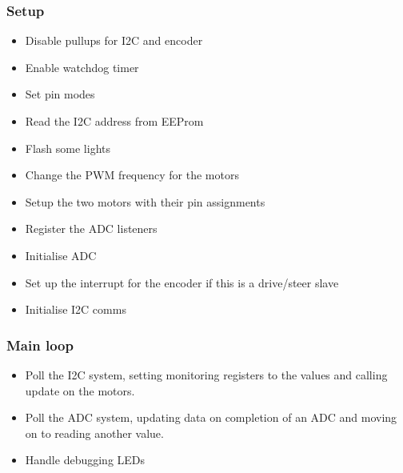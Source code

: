 \subsubsection{Setup}
\begin{itemize}
\item Disable pullups for I2C and encoder
\item Enable watchdog timer
\item Set pin modes
\item Read the I2C address from EEProm 
\item Flash some lights
\item Change the PWM frequency for the motors
\item Setup the two motors with their pin assignments
\item Register the ADC listeners
\item Initialise ADC
\item Set up the interrupt for the encoder if this is a drive/steer slave
\item Initialise I2C comms
\end{itemize}
\subsubsection{Main loop}
\begin{itemize}
\item Poll the I2C system, setting monitoring registers to the values and calling update on the motors.
\item Poll the ADC system, updating data on completion of an ADC and moving on to reading another value.
\item Handle debugging LEDs
\end{itemize}

